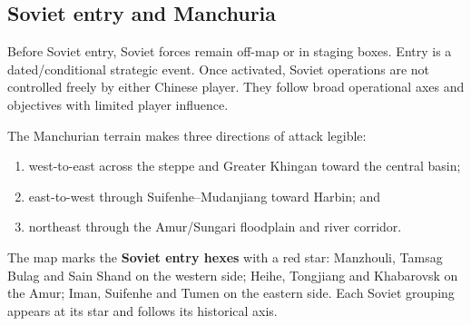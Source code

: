\documentclass[11pt]{article}
\begin{document}
\subsection{Soviet entry and Manchuria}
Before Soviet entry, Soviet forces remain off-map or in staging boxes. Entry is a dated/conditional strategic event. Once activated, Soviet operations are not controlled freely by either Chinese player. They follow broad operational axes and objectives with limited player influence.

The Manchurian terrain makes three directions of attack legible:
\begin{enumerate}
\item west-to-east across the steppe and Greater Khingan toward the central basin;
\item east-to-west through Suifenhe--Mudanjiang toward Harbin; and
\item northeast through the Amur/Sungari floodplain and river corridor.
\end{enumerate}

The map marks the \textbf{Soviet entry hexes} with a red star: Manzhouli, Tamsag Bulag and Sain Shand on the western side; Heihe, Tongjiang and Khabarovsk on the Amur; Iman, Suifenhe and Tumen on the eastern side. Each Soviet grouping appears at its star and follows its historical axis.
\end{document}

